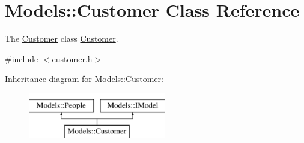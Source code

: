 \hypertarget{classModels_1_1Customer}{}\section{Models\+:\+:Customer Class Reference}
\label{classModels_1_1Customer}


The \hyperlink{classModels_1_1Customer}{Customer} class \hyperlink{classModels_1_1Customer}{Customer}.  




{\ttfamily \#include $<$customer.\+h$>$}

Inheritance diagram for Models\+:\+:Customer\+:\begin{figure}[H]
\begin{center}
\leavevmode
\includegraphics[height=2.000000cm]{db/dd7/classModels_1_1Customer}
\end{center}
\end{figure}
